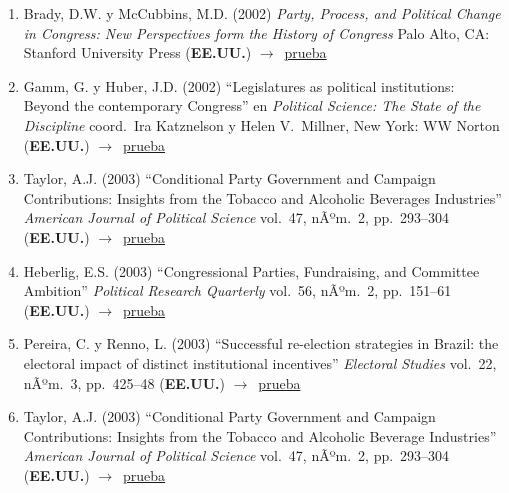 \documentclass[12 pt, letter]{article}
\newenvironment{CitasMiTrabajo}{
    \begin{footnotesize}
    \begin{enumerate}[label={\footnotesize\emph{cita~\arabic*}},ref=\arabic*] %
        \setlength{\itemsep}{.1\itemsep}
        \setlength{\parskip}{.1\parskip}
    }{\end{enumerate}\end{footnotesize}}
\begin{document}
\begin{CitasMiTrabajo}
        \item Brady, D.W. y McCubbins, M.D. (2002)
        \emph{Party, Process, and Political Change in Congress: New Perspectives form the History of
        Congress} Palo Alto, CA: Stanford University Press  (\textbf{EE.UU.}) $\rightarrow$~\href{http://ericmagar.com/cv/cites/coxMagar/brady.pdf}{prueba}

        \item Gamm, G. y  Huber, J.D. (2002)
        ``Legislatures as political
        institutions: Beyond the contemporary Congress'' en \emph{Political
        Science: The State of the Discipline} coord.\ Ira Katznelson y Helen
        V.\ Millner, New York: WW Norton  (\textbf{EE.UU.}) $\rightarrow$~\href{http://ericmagar.com/cv/cites/coxMagar/gamm.pdf}{prueba}

        \item Taylor, A.J. (2003)
        ``Conditional Party Government and Campaign Contributions: Insights
        from the Tobacco and Alcoholic Beverages Industries'' \emph{American
        Journal of Political Science} vol.\ 47, nÃºm.\ 2, pp.\ 293--304  (\textbf{EE.UU.}) $\rightarrow$~\href{http://ericmagar.com/cv/cites/coxMagar/taylor.pdf}{prueba}

        \item Heberlig, E.S. (2003)
        ``Congressional Parties, Fundraising, and Committee Ambition'' \emph{Political Research Quarterly} vol.\ 56, nÃºm.\ 2, pp.\ 151--61
        (\textbf{EE.UU.}) $\rightarrow$~\href{http://ericmagar.com/cv/cites/coxMagar/heber.pdf}{prueba}

        \item Pereira, C. y Renno, L. (2003)
        ``Successful re-election strategies in Brazil: the electoral impact of distinct
        institutional incentives'' \emph{Electoral Studies} vol.\ 22, nÃºm.\ 3, pp.\
        425--48  (\textbf{EE.UU.}) $\rightarrow$~\href{http://ericmagar.com/cv/cites/coxMagar/perRenno2.pdf}{prueba}

        \item Taylor, A.J. (2003)
        ``Conditional Party Government and Campaign
        Contributions: Insights from the Tobacco and Alcoholic Beverage Industries''
        \emph{American Journal of Political Science}
        vol.\ 47, nÃºm.\ 2, pp.\ 293--304 (\textbf{EE.UU.}) $\rightarrow$~\href{http://ericmagar.com/cv/cites/coxMagar/taylos2.pdf}{prueba}


\end{CitasMiTrabajo}
\end{document}
